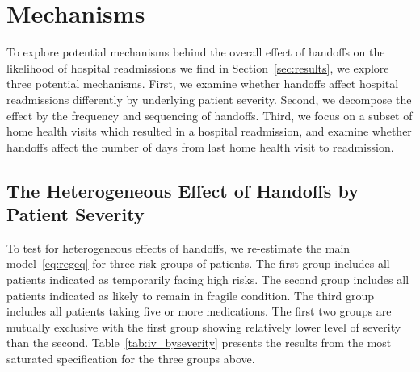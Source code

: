 \documentclass[final,12pt, notitlepage]{article}
\begin{document}


\section{Mechanisms} \label{sec:mechanism}

To explore potential mechanisms behind the overall effect of handoffs on the likelihood of hospital readmissions we find in Section~\ref{sec:results}, we explore three potential mechanisms. First, we examine whether handoffs affect hospital readmissions differently by underlying patient severity. Second, we decompose the effect by the frequency and sequencing of handoffs. Third, we focus on a subset of home health visits which resulted in a hospital readmission, and examine whether handoffs affect the number of days from last home health visit to readmission.

\subsection{The Heterogeneous Effect of Handoffs by Patient Severity}
To test for heterogeneous effects of handoffs, we re-estimate the main model~\ref{eq:regeq} for three risk groups of patients. The first group includes all patients indicated as temporarily facing high risks. The second group includes all patients indicated as likely to remain in fragile condition. The third group includes all patients taking five or more medications. The first two groups are mutually exclusive with the first group showing relatively lower level of severity than the second. Table~\ref{tab:iv_byseverity} presents the results from the most saturated specification for the three groups above.
\end{document}
